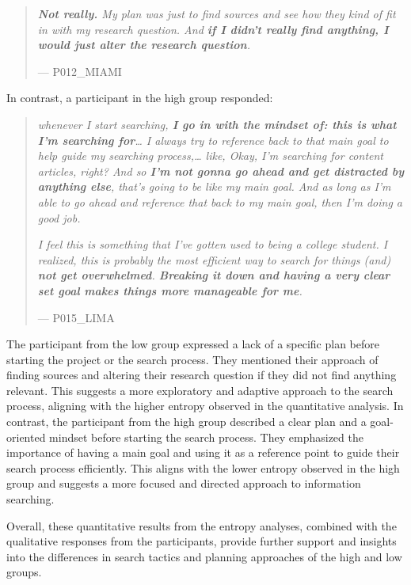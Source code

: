 \documentclass[letterpaper, nobind]{templates/ociamthesis}
\begin{document}
\begin{quote}
\emph{\textbf{Not really.} My plan was just to find sources and see how they kind of fit in with my research question. And \textbf{if I didn't really find anything, I would just alter the research question}.}

\hfill --- P012\_MIAMI
\end{quote}

In contrast, a participant in the high group responded:

\begin{quote}
\emph{whenever I start searching, \textbf{I go in with the mindset of: this is what I'm searching for}\ldots{} I always try to reference back to that main goal to help guide my searching process,\ldots{} like, Okay, I'm searching for content articles, right? And so \textbf{I'm not gonna go ahead and get distracted by anything else}, that's going to be like my main goal. And as long as I'm able to go ahead and reference that back to my main goal, then I'm doing a good job.}

\emph{I feel this is something that I've gotten used to being a college student. I realized, this is probably the most efficient way to search for things (and) \textbf{not get overwhelmed}. \textbf{Breaking it down and having a very clear set goal makes things more manageable for me}.}

\hfill --- P015\_LIMA
\end{quote}

The participant from the low group expressed a lack of a specific plan before starting the project or the search process. They mentioned their approach of finding sources and altering their research question if they did not find anything relevant. This suggests a more exploratory and adaptive approach to the search process, aligning with the higher entropy observed in the quantitative analysis.
In contrast, the participant from the high group described a clear plan and a goal-oriented mindset before starting the search process. They emphasized the importance of having a main goal and using it as a reference point to guide their search process efficiently. This aligns with the lower entropy observed in the high group and suggests a more focused and directed approach to information searching.

Overall, these quantitative results from the entropy analyses, combined with the qualitative responses from the participants, provide further support and insights into the differences in search tactics and planning approaches of the high and low groups.
\end{document}
